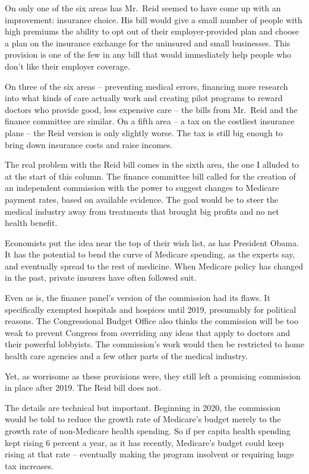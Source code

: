 ﻿\documentclass[12pt]{article}
\begin{document}
On only one of the six areas has Mr.~Reid seemed to have come up with an improvement: insurance
choice. His bill would give a small number of people with high premiums the ability to opt out of
their employer-provided plan and choose a plan on the insurance exchange for the uninsured and small
businesses. This provision is one of the few in any bill that would immediately help people who
don't like their employer coverage.

On three of the six areas -- preventing medical errors, financing more research into what kinds of
care actually work and creating pilot programs to reward doctors who provide good, less expensive
care -- the bills from Mr.~Reid and the finance committee are similar. On a fifth area -- a tax on
the costliest insurance plans -- the Reid version is only slightly worse. The tax is still big
enough to bring down insurance costs and raise incomes.

The real problem with the Reid bill comes in the sixth area, the one I alluded to at the start of
this column. The finance committee bill called for the creation of an independent commission with
the power to suggest changes to Medicare payment rates, based on available evidence. The goal would
be to steer the medical industry away from treatments that brought big profits and no net health
benefit.

Economists put the idea near the top of their wish list, as has President Obama. It has the
potential to bend the curve of Medicare spending, as the experts say, and eventually spread to the
rest of medicine. When Medicare policy has changed in the past, private insurers have often followed
suit.

Even as is, the finance panel's version of the commission had its flaws. It specifically exempted
hospitals and hospices until 2019, presumably for political reasons. The Congressional Budget Office
also thinks the commission will be too weak to prevent Congress from overriding any ideas that apply
to doctors and their powerful lobbyists. The commission's work would then be restricted to home
health care agencies and a few other parts of the medical industry.

Yet, as worrisome as these provisions were, they still left a promising commission in place after
2019. The Reid bill does not.

The details are technical but important. Beginning in 2020, the commission would be told to reduce
the growth rate of Medicare's budget merely to the growth rate of non-Medicare health spending. So
if per capita health spending kept rising 6 percent a year, as it has recently, Medicare's budget
could keep rising at that rate -- eventually making the program insolvent or requiring huge tax
increases.
\end{document}
